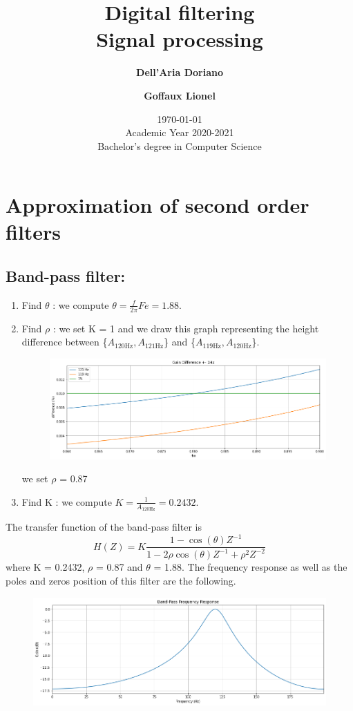 \documentclass[]{article}
\title{
{\Huge Digital filtering}\\
Signal processing\\
}
\author{
\textbf{Dell’Aria Doriano}\\
\and
\textbf{Goffaux Lionel}
}
\date{\today\\
Academic Year 2020-2021\\
Bachelor's degree in Computer Science}
\begin{document}
\maketitle

\section{Approximation of second order filters}
\subsection*{Band-pass filter:}
\begin{enumerate}
    \item Find $\theta$ : we compute $\theta = \frac{f}{2\pi}Fe = 1.88$.
    \item Find $\rho$ : we set K = 1 and we draw this graph representing the height difference between \{$A_{120\text{Hz}},A_{121\text{Hz}}$\} and \{$A_{119\text{Hz}},A_{120\text{Hz}}$\}.
    \begin{figure}[H]
        \centering
        \includegraphics[scale=0.5]{q11.png}
    \end{figure}
    we set $\rho$ = 0.87
    \item Find K : we compute $K = \frac{1}{A_{120\text{Hz}}}=0.2432$.
\end{enumerate}
The transfer function of the band-pass filter is 
$$H(Z) = K\frac{1 - \cos{(\theta)} Z^{-1}}{1 - 2\rho \cos{(\theta)Z^{-1} +\rho^2Z^{-2}}}$$
where K = 0.2432, $\rho$ = 0.87 and $\theta$ = 1.88. The frequency response as well as the poles and zeros position of this filter are the following.

\begin{figure}[H]
    \centering
    \includegraphics[scale=0.5]{q12.png}
\end{figure}
\end{document}
